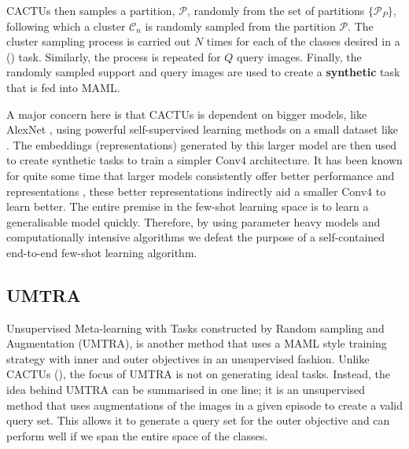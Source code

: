 CACTUs then samples a partition, $\mathcal{P}$, randomly from the set of partitions $\{\mathcal{P}_P\}$, following which a cluster $\mathcal{C}_n$ is randomly sampled from the partition $\mathcal{P}$. The cluster sampling process is carried out $N$ times for each of the classes desired in a () task. Similarly, the process is repeated for $Q$ query images. Finally, the randomly sampled support and query images are used to create a \textbf{synthetic} task that is fed into MAML.

A major concern here is that CACTUs is dependent on bigger models, like AlexNet \parencite{AlexNet2012}, using powerful self-supervised learning methods on a small dataset like \miniImagenet{}. The embeddings (representations) generated by this larger model are then used to create synthetic tasks to train a simpler Conv$4$ architecture. It has been known for quite some time that larger models consistently offer better performance and representations \parencite{Dosovitskiy2020, He2015}, these better representations indirectly aid a smaller Conv$4$ to learn better. The entire premise in the few-shot learning space is to learn a generalisable model quickly. Therefore, by using parameter heavy models and computationally intensive algorithms we defeat the purpose of a self-contained end-to-end few-shot learning algorithm.

\subsection{UMTRA} \label{ssec:umtra}

Unsupervised Meta-learning with Tasks constructed by Random sampling and Augmentation (UMTRA), is another method that uses a MAML style training strategy with inner and outer objectives in an unsupervised fashion.
Unlike CACTUs (), the focus of UMTRA is not on generating ideal tasks. 
Instead, the idea behind UMTRA can be summarised in one line; it is an unsupervised method that uses augmentations of the images in a given episode to create a valid query set. This allows it to generate a  query set for the outer objective and can perform well if we span the entire space of the classes.

